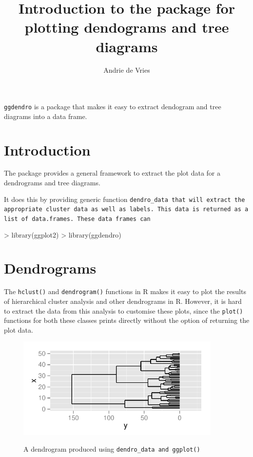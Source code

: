 \documentclass[a4paper]{article}
\title{Introduction to the \ggdendro{} package for plotting dendograms and tree diagrams}
\author{Andrie de Vries}
\newcommand{\ggdendro}{{\tt ggdendro}}
\newcommand{\dendrodata}{\tt dendro\_data}}
\newcommand{\code}[1]{{\tt #1}}
\begin{document}
\maketitle

\ggdendro{} is a package that makes it easy to extract dendogram and tree diagrams into a data frame.  

\section{Introduction}

The \ggluster{} package provides a general framework to extract the plot data for a dendrograms and tree diagrams.

It does this by providing generic function \dendrodata{} that will extract the appropriate cluster data as well as labels.  This data is returned as a list of data.frames.  These data frames can 
  
\begin{Schunk}
\begin{Sinput}
> library(ggplot2)
> library(ggdendro)
\end{Sinput}
\end{Schunk}


\section{Dendrograms}

The \code{hclust()} and \code{dendrogram()} functions in R makes it easy to plot the results of hierarchical cluster analysis and other dendrograms in R.  However, it is hard to extract the data from this analysis to customise these plots, since the \code{plot()} functions for both these classes prints directly without the option of returning the plot data.  

\begin{Schunk}
\end{Schunk}

\begin{figure}[h]
\begin{center}
{
\includegraphics[width=4in, height=2in]{ggdendro-dendro1}
}
\end{center}
\caption{A dendrogram produced using \dendrodata{} and \code{ggplot()}}
\end{figure}
\end{document}
